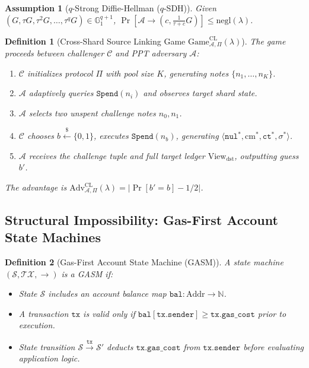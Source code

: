 \documentclass[sigconf,nonacm]{acmart}
\newtheorem{definition}{Definition}
\newtheorem{assumption}{Assumption}
\begin{document}
\begin{assumption}[$q$-Strong Diffie-Hellman ($q$-SDH)]
Given $(G, \tau G, \tau^2 G, \dots, \tau^q G) \in \mathbb{G}_1^{q+1}$, $\Pr[\mathcal{A} \to (c, \frac{1}{\tau + c} G)] \le \text{negl}(\lambda)$.
\end{assumption}

\begin{definition}[Cross-Shard Source Linking Game $\text{Game}^{\text{CL}}_{\mathcal{A}, \Pi}(\lambda)$]
The game proceeds between challenger $\mathcal{C}$ and PPT adversary $\mathcal{A}$:
\begin{enumerate}
    \item $\mathcal{C}$ initializes protocol $\Pi$ with pool size $K$, generating notes $\{n_1, \dots, n_K\}$.
    \item $\mathcal{A}$ adaptively queries $\mathtt{Spend}(n_i)$ and observes target shard state.
    \item $\mathcal{A}$ selects two unspent challenge notes $n_0, n_1$.
    \item $\mathcal{C}$ chooses $b \xleftarrow{\$} \{0, 1\}$, executes $\mathtt{Spend}(n_b)$, generating $\langle \mathtt{nul}^*, \text{cm}^*, \mathtt{ct}^*, \sigma^* \rangle$.
    \item $\mathcal{A}$ receives the challenge tuple and full target ledger $\text{View}_{\text{dst}}$, outputting guess $b'$.
\end{enumerate}
The advantage is $\text{Adv}^{\text{CL}}_{\mathcal{A}, \Pi}(\lambda) = |\Pr[b' = b] - 1/2|$.
\end{definition}

\subsection{Structural Impossibility: Gas-First Account State Machines}

\begin{definition}[Gas-First Account State Machine (GASM)]
A state machine $(\mathcal{S}, \mathcal{TX}, \to)$ is a GASM if:
\begin{itemize}
    \item State $\mathcal{S}$ includes an account balance map $\mathtt{bal}: \text{Addr} \to \mathbb{N}$.
    \item A transaction $\mathtt{tx}$ is valid only if $\mathtt{bal}[\mathtt{tx.sender}] \ge \mathtt{tx.gas\_cost}$ prior to execution.
    \item State transition $\mathcal{S} \xrightarrow{\mathtt{tx}} \mathcal{S}'$ deducts $\mathtt{tx.gas\_cost}$ from $\mathtt{tx.sender}$ before evaluating application logic.
\end{itemize}
\end{definition}
\end{document}
